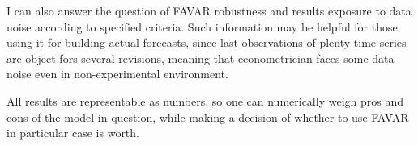 \documentclass[a4paper, 14pt]{article}
\begin{document}
I can also answer the question of FAVAR robustness and results exposure to data noise according to specified criteria. Such information may be helpful for those using it for building actual forecasts, since last observations of plenty time series are object fors several revisions, meaning that econometrician faces some data noise even in non-experimental environment. 

All results are representable as numbers, so one can numerically weigh pros and cons of the model in question, while making a decision of whether to use FAVAR in particular case is worth.

\newpage


\end{document}
